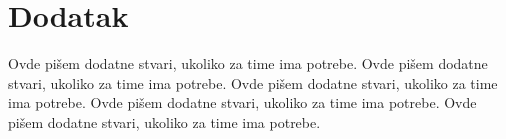 \documentclass[a4paper]{article}
\begin{document}
\appendix
 


\appendix
\section{Dodatak}
Ovde pišem dodatne stvari, ukoliko za time ima potrebe.
Ovde pišem dodatne stvari, ukoliko za time ima potrebe.
Ovde pišem dodatne stvari, ukoliko za time ima potrebe.
Ovde pišem dodatne stvari, ukoliko za time ima potrebe.
Ovde pišem dodatne stvari, ukoliko za time ima potrebe.
\end{document}
